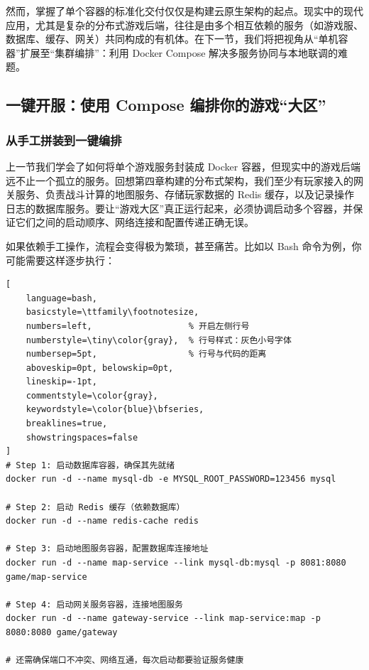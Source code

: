 然而，掌握了单个容器的标准化交付仅仅是构建云原生架构的起点。现实中的现代应用，尤其是复杂的分布式游戏后端，往往是由多个相互依赖的服务（如游戏服、数据库、缓存、网关）共同构成的有机体。在下一节，我们将把视角从“单机容器”扩展至“集群编排”：利用 Docker Compose 解决多服务协同与本地联调的难题。



\subsection{一键开服：使用 Compose 编排你的游戏``大区''}

\subsubsection{从手工拼装到一键编排}

上一节我们学会了如何将单个游戏服务封装成 Docker 容器，但现实中的游戏后端远不止一个孤立的服务。回想第四章构建的分布式架构，我们至少有玩家接入的网关服务、负责战斗计算的地图服务、存储玩家数据的 Redis 缓存，以及记录操作日志的数据库服务。要让“游戏大区”真正运行起来，必须协调启动多个容器，并保证它们之间的启动顺序、网络连接和配置传递正确无误。

如果依赖手工操作，流程会变得极为繁琐，甚至痛苦。比如以 Bash 命令为例，你可能需要这样逐步执行：

\begin{tcolorbox}[title=手工操作]
\begin{lstlisting}[
    language=bash,
    basicstyle=\ttfamily\footnotesize,
    numbers=left,                   % 开启左侧行号
    numberstyle=\tiny\color{gray},  % 行号样式：灰色小号字体
    numbersep=5pt,                  % 行号与代码的距离
    aboveskip=0pt, belowskip=0pt,
    lineskip=-1pt,
    commentstyle=\color{gray},
    keywordstyle=\color{blue}\bfseries,
    breaklines=true,
    showstringspaces=false
]
# Step 1: 启动数据库容器，确保其先就绪
docker run -d --name mysql-db -e MYSQL_ROOT_PASSWORD=123456 mysql

# Step 2: 启动 Redis 缓存（依赖数据库）
docker run -d --name redis-cache redis

# Step 3: 启动地图服务容器，配置数据库连接地址
docker run -d --name map-service --link mysql-db:mysql -p 8081:8080 game/map-service

# Step 4: 启动网关服务容器，连接地图服务
docker run -d --name gateway-service --link map-service:map -p 8080:8080 game/gateway

# 还需确保端口不冲突、网络互通，每次启动都要验证服务健康
\end{lstlisting}
\end{tcolorbox}

